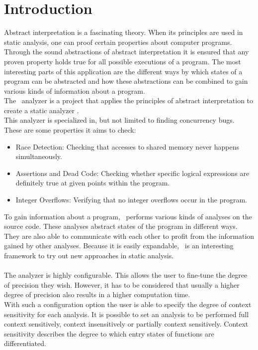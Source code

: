 
\chapter{Introduction}\label{chapter:introduction}
  Abstract interpretation is a fascinating theory. When its principles are used in static analysis, one can proof certain properties about computer programs. Through the sound abstractions of abstract interpretation it is ensured that any proven property holds true for all possible executions of a program. The most interesting parts of this application are the different ways by which states of a program can be abstracted and how these abstractions can be combined to gain various kinds of information about a program.\\
  The \gob\ analyzer is a project that applies the principles of abstract interpretation to create a static analyzer \parencite{goblintHome}.\\
  This analyzer is specialized in, but not limited to finding concurrency bugs. These are some properties it aims to check:
  \begin{itemize}
    \item Race Detection: Checking that accesses to shared memory never happens simultaneously.
    \item Assertions and Dead Code: Checking whether specific logical expressions are definitely true at given points within the program. 
    \item Integer Overflows: Verifying that no integer overflows occur in the program.
  \end{itemize}
  To gain information about a program, \gob\ performs various kinds of analyses on the source code. These analyses abstract states of the program in different ways. They are also able to communicate with each other to profit from the information gained by other analyses. Because it is easily expandable, \gob\ is an interesting framework to try out new approaches in static analysis.\\
  \\
  The analyzer is highly configurable. This allows the user to fine-tune the degree of precision they wish. However, it has to be considered that usually a higher degree of precision also results in a higher computation time.\\
  With such a configuration option the user is able to specify the degree of context sensitivity for each analysis. It is possible to set an analysis to be performed full context sensitively, context insensitively or partially context sensitively. Context sensitivity describes the degree to which entry states of functions are differentiated.\\
